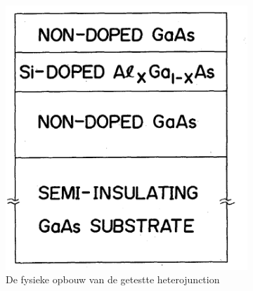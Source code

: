 \documentclass[11pt]{article}
\begin{document}
\begin{figure}[h]
  \centering
  \begin{subfigure}[b]{0.45\textwidth}
    \includegraphics[width=\textwidth]{physical_structure.png}
    \caption{De fysieke opbouw van de getestte heterojunction}
    \label{fig:phsyical_structure}
  \end{subfigure}
  ~
  \begin{subfigure}[b]{0.45\textwidth}

\end{subfigure}
\end{figure}
\end{document}
